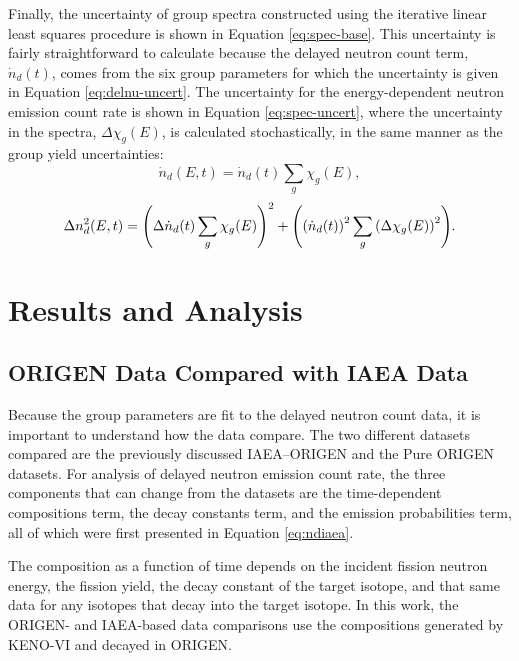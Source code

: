 \documentclass{style/nseJournal}
\begin{document}
Finally, the uncertainty of group spectra constructed using the iterative linear least squares procedure is shown in Equation \eqref{eq:spec-base}.
This uncertainty is fairly straightforward to calculate because the delayed neutron count term, $\dot{n}_d(t)$, comes from the six group parameters for which the uncertainty is given in Equation \eqref{eq:delnu-uncert}.
The uncertainty for the energy-dependent neutron emission count rate is shown in Equation \eqref{eq:spec-uncert}, where the uncertainty in the spectra, $\Delta \chi_g(E)$, is calculated stochastically, in the same manner as the group yield uncertainties:
\begin{equation}
\dot{n}_d(E, t) = \dot{n}_d(t) \sum_g \chi_g (E)
\label{eq:spec-base},
\end{equation}
\begin{equation}
\Delta n_d^2(E, t) = \left( \Delta \dot{n}_d(t) \sum_g \chi_g(E) \right)^2 + \left( \left( \dot{n}_d(t) \right)^2 \sum_g \left( \Delta \chi_g(E) \right)^2 \right) \hspace{-2pt} .
\label{eq:spec-uncert}
\end{equation}




\section{Results and Analysis}


\subsection{ORIGEN Data Compared with IAEA Data}

Because the group parameters are fit to the delayed neutron count data, it is important to understand how the data compare.
The two different datasets compared are the previously discussed IAEA--ORIGEN and the Pure ORIGEN datasets.
For analysis of delayed neutron emission count rate, the three components that can change from the datasets are the time-dependent compositions term, the decay constants term, and the emission probabilities term, all of which were first presented in Equation \eqref{eq:ndiaea}.

The composition as a function of time depends on the incident fission neutron energy, the fission yield, the decay constant of the target isotope, and that same data for any isotopes that decay into the target isotope. In this work, the ORIGEN- and IAEA-based data comparisons use the compositions generated by KENO-VI and decayed in ORIGEN.
\end{document}
